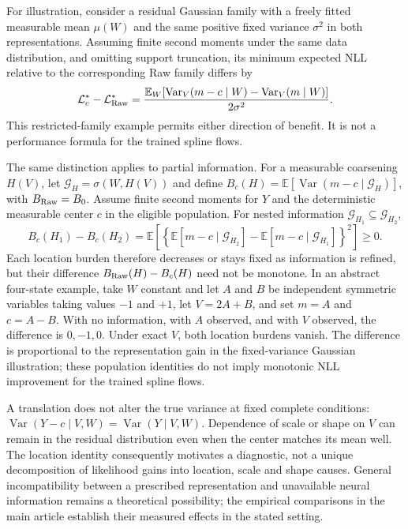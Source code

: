 For illustration, consider a residual
Gaussian family with a freely fitted measurable mean $\mu(W)$ and the same
positive fixed variance $\sigma^2$ in both representations. Assuming finite
second moments under the same data distribution, and omitting support
truncation, its minimum expected NLL
relative to the corresponding Raw family differs by
\begin{equation}
 \mathcal L_c^*-\mathcal L_{\mathrm{Raw}}^*
 =\frac{\mathbb E_W\!\left[
 \operatorname{Var}_V(m-c\mid W)-\operatorname{Var}_V(m\mid W)
 \right]}{2\sigma^2}.
 \label{eq:gaussian_illustration}
\end{equation}
This restricted-family example permits either direction of benefit. It is not
a performance formula for the trained spline flows.

The same distinction applies to partial information. For a measurable
coarsening $H(V)$, let $\mathcal G_H=\sigma(W,H(V))$ and define
$B_c(H)=\mathbb E[\operatorname{Var}(m-c\mid\mathcal G_H)]$, with
$B_{\mathrm{Raw}}=B_0$. Assume finite second moments for $Y$ and the deterministic
measurable center $c$ in the eligible population. For nested information
$\mathcal G_{H_1}\subseteq\mathcal G_{H_2}$,
\begin{equation}
 B_c(H_1)-B_c(H_2)=\mathbb E\!\left[
 \left\{\mathbb E[m-c\mid\mathcal G_{H_2}]
       -\mathbb E[m-c\mid\mathcal G_{H_1}]\right\}^{2}\right]\geq0.
 \label{eq:information_refinement}
\end{equation}
Each location burden therefore decreases or stays fixed as information is
refined, but their difference $B_{\mathrm{Raw}}(H)-B_c(H)$ need not be monotone.
In an abstract four-state example, take $W$ constant and let $A$ and $B$ be independent symmetric variables taking values
$-1$ and $+1$, let $V=2A+B$, and set $m=A$ and $c=A-B$. With no information,
with $A$ observed, and with $V$ observed, the difference is $0,-1,0$.
Under exact $V$, both location burdens vanish. The difference is proportional
to the representation gain in the fixed-variance Gaussian illustration;
these population identities do not imply monotonic NLL improvement for the
trained spline flows.

A translation does not alter the true variance at fixed complete conditions:
$\operatorname{Var}(Y-c\mid V,W)=\operatorname{Var}(Y\mid V,W)$.
Dependence of scale or shape on $V$ can remain in the residual distribution
even when the center matches its mean well. The location identity consequently
motivates a diagnostic, not a unique decomposition of likelihood gains into
location, scale and shape causes. General incompatibility between a prescribed
representation and unavailable neural information remains a theoretical
possibility; the empirical comparisons in the main article establish their measured
effects in the stated setting.

